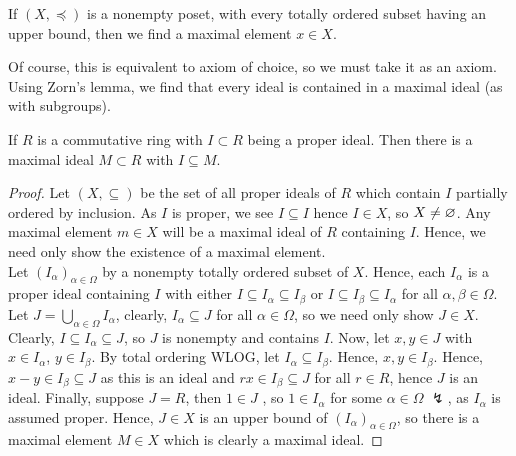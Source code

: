 \begin{law}
	If \(\left( X, \preceq \right) \) is a nonempty poset, with every totally ordered subset having an upper bound, then we find a maximal element \(x \in X\).
\end{law}
Of course, this is equivalent to axiom of choice, so we must take it as an axiom. Using Zorn's lemma, we find that every ideal is contained in a maximal ideal (as with subgroups).
\begin{theorem}
	If \(R\) is a commutative ring with \(I \subset R\) being a proper ideal. Then there is a maximal ideal \(M \subset R\) with \(I \subseteq M\).
\end{theorem}
\begin{proof}
	Let \(\left( X, \subseteq \right) \) be the set of all proper ideals of \(R\) which contain \(I\) partially ordered by inclusion. As \(I\) is proper, we see \(I \subseteq I\) hence \(I \in X\), so \(X \neq \varnothing\). Any maximal element \(m \in X\) will be a maximal ideal of \(R\) containing \(I\). Hence, we need only show the existence of a maximal element.\\
	Let \(\left( I_{\alpha} \right)_{\alpha \in \Omega} \) by a nonempty totally ordered subset of \(X\). Hence, each \(I_{\alpha}\) is a proper ideal containing \(I\) with either \(I \subseteq I_{\alpha} \subseteq I_{\beta}\) or \(I \subseteq I_{\beta} \subseteq I_{\alpha}\) for all \(\alpha, \beta \in \Omega\). Let \(J = \bigcup_{\alpha \in \Omega} I_{\alpha}\), clearly, \(I_{\alpha}\subseteq J\) for all \(\alpha \in \Omega\), so we need only show \(J \in X\). Clearly, \(I \subseteq I_{\alpha} \subseteq J\), so \(J\) is nonempty and contains \(I\). Now, let \(x, y \in J\) with \(x \in I_{\alpha}\), \(y \in I_{\beta}\). By total ordering WLOG, let \(I_{\alpha} \subseteq I_{\beta}\). Hence, \(x, y \in I_{\beta}\). Hence, \(x - y \in I_{\beta} \subseteq J\) as this is an ideal and \(rx \in I_{\beta} \subseteq J \) for all \(r \in R\), hence \(J\) is an ideal. Finally, suppose \(J = R\), then \(1 \in J\) , so \(1 \in I_{\alpha}\) for some \(\alpha \in \Omega\) \(\lightning\), as \(I_{\alpha}\) is assumed proper. Hence, \(J \in X\) is an upper bound of \(\left( I_{\alpha} \right)_{\alpha \in \Omega} \), so there is a maximal element \(M \in X\) which is clearly a maximal ideal.
\end{proof}
